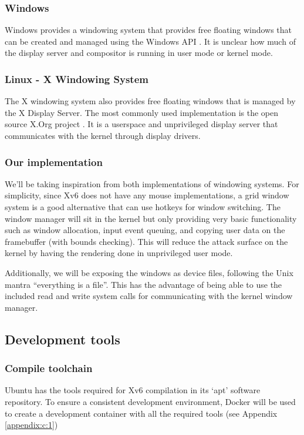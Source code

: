 \subsubsection{Windows}
Windows provides a windowing system that provides free floating windows that can be created
and managed using the Windows API \cite{windowsapi:window}. It is unclear how much of the display
server and compositor is running in user mode or kernel mode.
\subsubsection{Linux - X Windowing System}
The X windowing system also provides free floating windows that is managed by the X Display Server. 
The most commonly used implementation is the open source X.Org project \cite{Xorg}. It is a userspace and unprivileged
display server that communicates with the kernel through display drivers.
\subsubsection{Our implementation}
We'll be taking inspiration from both implementations of windowing systems. For simplicity,
since Xv6 does not have any mouse implementations, a grid window system is a good alternative
that can use hotkeys for window switching. The window manager will sit in the kernel but only
providing very basic functionality such as window allocation, input event queuing, and copying
user data on the framebuffer (with bounds checking). This will reduce the attack surface
on the kernel by having the rendering done in unprivileged user mode.

Additionally, we will be exposing the windows as device files, following the Unix mantra
``everything is a file''. This has the advantage of being able to use the included
read and write system calls for communicating with the kernel window manager.

\subsection{Development tools}
\subsubsection{Compile toolchain}
Ubuntu has the tools required for Xv6 compilation in its `apt' software repository. 
To ensure a consistent development environment, Docker will be used to create a 
development container with all the required tools (see Appendix \ref{appendix:c:1})
